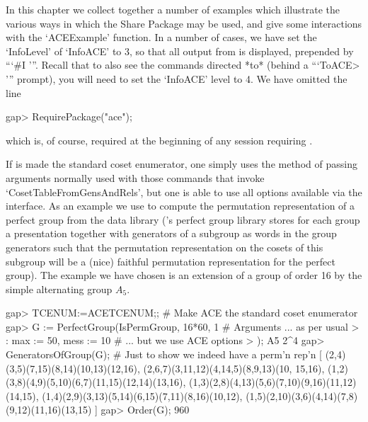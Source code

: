 

In this chapter  we  collect  together  a  number  of  examples  which
illustrate the various ways in which the {\ACE} Share Package  may  be
used, and give some interactions with the `ACEExample' function. In  a
number of cases, we have set the `InfoLevel' of  `InfoACE'  to  3,  so
that all output from {\ACE} is displayed,  prepended  by  ```\#I  '''.
Recall that to also see the commands directed *to*  {\ACE}  (behind  a
```ToACE> ''' prompt), you will need to set the `InfoACE' level to  4.
We have omitted the line

\beginexample
gap> RequirePackage("ace");
\endexample

which is,  of  course,  required  at  the  beginning  of  any  session
requiring {\ACE}.


If {\ACE} is made the standard coset enumerator, one simply  uses  the
method of passing arguments normally used  with  those  commands  that
invoke `CosetTableFromGensAndRels', but one is able to use all options
available via the {\ACE} interface. As an example  we  use  {\ACE}  to
compute the permutation representation of a  perfect  group  from  the
data library ({\GAP}'s perfect group library stores for each  group  a
presentation together with generators of a subgroup as  words  in  the
group generators such  that  the  permutation  representation  on  the
cosets  of  this  subgroup  will  be  a  (nice)  faithful  permutation
representation for the perfect group). The example we have  chosen  is
an extension of a group of order 16 by the  simple  alternating  group
$A_5$.

\beginexample
gap> TCENUM:=ACETCENUM;; # Make ACE the standard coset enumerator
gap> G := PerfectGroup(IsPermGroup, 16*60, 1   # Arguments ... as per usual
>                      : max := 50, mess := 10 # ... but we use ACE options
>                      );
A5 2^4
gap> GeneratorsOfGroup(G); # Just to show we indeed have a perm'n rep'n
[ (2,4)(3,5)(7,15)(8,14)(10,13)(12,16), (2,6,7)(3,11,12)(4,14,5)(8,9,13)(10,
    15,16), (1,2)(3,8)(4,9)(5,10)(6,7)(11,15)(12,14)(13,16), 
  (1,3)(2,8)(4,13)(5,6)(7,10)(9,16)(11,12)(14,15), 
  (1,4)(2,9)(3,13)(5,14)(6,15)(7,11)(8,16)(10,12), 
  (1,5)(2,10)(3,6)(4,14)(7,8)(9,12)(11,16)(13,15) ]
gap> Order(G);
960
\endexample


